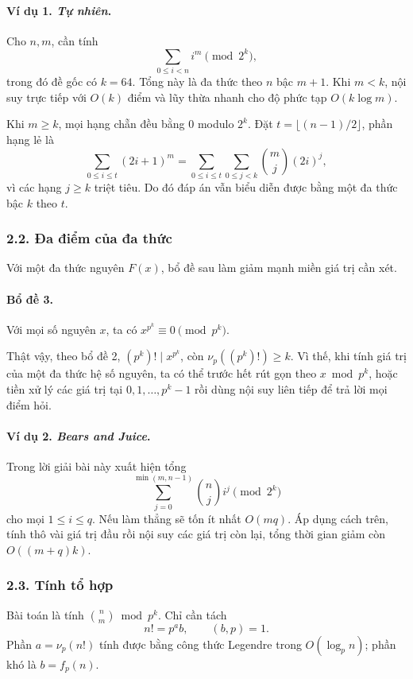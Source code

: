 \documentclass[11pt]{article}
\begin{document}
\paragraph{Ví dụ 1. \emph{Tự nhiên}.}
Cho \(n,m\), cần tính
\[
  \sum_{0\le i<n} i^m \pmod {2^k},
\]
trong đó đề gốc có \(k=64\). Tổng này là đa thức theo \(n\) bậc \(m+1\). Khi
\(m<k\), nội suy trực tiếp với \(O(k)\) điểm và lũy thừa nhanh cho độ phức tạp
\(O(k\log m)\).

Khi \(m\ge k\), mọi hạng chẵn đều bằng \(0\) modulo \(2^k\). Đặt
\(t=\lfloor(n-1)/2\rfloor\), phần hạng lẻ là
\[
  \sum_{0\le i\le t}(2i+1)^m
  =\sum_{0\le i\le t}\sum_{0\le j<k}\binom mj(2i)^j,
\]
vì các hạng \(j\ge k\) triệt tiêu. Do đó đáp án vẫn biểu diễn được bằng một đa
thức bậc \(k\) theo \(t\).

\subsubsection*{2.2. Đa điểm của đa thức}

Với một đa thức nguyên \(F(x)\), bổ đề sau làm giảm mạnh miền giá trị cần xét.

\paragraph{Bổ đề 3.}
Với mọi số nguyên \(x\), ta có \(x^{p^k}\equiv 0\pmod {p^k}\).

Thật vậy, theo bổ đề 2, \((p^k)!\mid x^{p^k}\), còn
\(\nu_p((p^k)!)\ge k\). Vì thế, khi tính giá trị của một đa thức hệ số nguyên,
ta có thể trước hết rút gọn theo \(x\bmod p^k\), hoặc tiền xử lý các giá trị
tại \(0,1,\ldots,p^k-1\) rồi dùng nội suy liên tiếp để trả lời mọi điểm hỏi.

\paragraph{Ví dụ 2. \emph{Bears and Juice}.}
Trong lời giải bài này xuất hiện tổng
\[
  \sum_{j=0}^{\min(m,n-1)}\binom nj i^j \pmod {2^k}
\]
cho mọi \(1\le i\le q\). Nếu làm thẳng sẽ tốn ít nhất \(O(mq)\). Áp dụng cách
trên, tính thô vài giá trị đầu rồi nội suy các giá trị còn lại, tổng thời gian
giảm còn \(O((m+q)k)\).

\subsubsection*{2.3. Tính tổ hợp}

Bài toán là tính \(\binom nm\bmod p^k\). Chỉ cần tách
\[
  n! = p^a b,\qquad (b,p)=1.
\]
Phần \(a=\nu_p(n!)\) tính được bằng công thức Legendre trong \(O(\log_p n)\);
phần khó là \(b=f_p(n)\).
\end{document}
